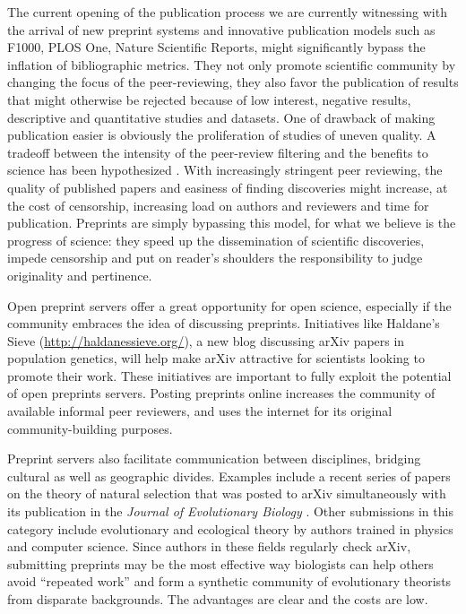 \documentclass[letterpaper,twocolumn,superscriptaddress,showkeys,longbibliography]{revtex4-1}
\begin{document}
The current opening of the publication process we are currently witnessing with
the arrival of new preprint systems and innovative publication models such as
F1000, PLOS One, Nature Scientific Reports, might significantly bypass the
inflation of bibliographic metrics. They not only promote scientific community
by changing the focus of the peer-reviewing, they also favor the publication of
results that might otherwise be rejected because of low interest, negative
results, descriptive and quantitative studies and datasets. One of drawback of
making publication easier is obviously the proliferation of studies of uneven
quality. A tradeoff between the intensity of the peer-review filtering and the
benefits to science has been hypothesized \cite{Aarssen2012}. With increasingly
stringent peer reviewing, the quality of published papers and easiness of
finding discoveries might increase, at the cost of censorship, increasing load
on authors and reviewers and time for publication. Preprints are simply
bypassing this model, for what we believe is the progress of science: they speed
up the dissemination of scientific discoveries, impede censorship and put on
reader's shoulders the responsibility to judge originality and pertinence.

Open preprint servers offer a great opportunity for open science, especially if
the community embraces the idea of discussing preprints. Initiatives like
Haldane's Sieve (\href{http://haldanessieve.org/}{http://haldanessieve.org/}), a
new blog discussing arXiv papers in population genetics, will help make arXiv
attractive for scientists looking to promote their work. These initiatives are
important to fully exploit the potential of open preprints servers. Posting
preprints online increases the community of available informal peer reviewers,
and uses the internet for its original community-building purposes.

Preprint servers also facilitate communication between disciplines, bridging
cultural as well as geographic divides. Examples include a recent series of
papers on the theory of natural selection that was posted to arXiv
simultaneously with its publication in the \emph{Journal of Evolutionary
Biology} \cite{JEB:JEB2431,JEB:JEB2498,JEB:JEB2378,JEB:JEB2373}. Other
submissions in this category include evolutionary and ecological theory by
authors trained in physics and computer science.  Since authors in these fields
regularly check arXiv, submitting preprints may be the most effective way
biologists can help others avoid ``repeated work'' \cite{de2011contribution} and
form a synthetic community of evolutionary theorists from disparate backgrounds.
The advantages are clear and the costs are low.
\end{document}
